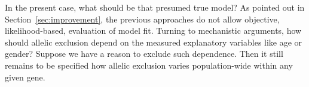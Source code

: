 \documentclass[letterpaper]{article}
\begin{document}
In the present case, what should be that presumed true model?  As pointed out
in Section~\ref{sec:improvement}, the previous approaches do not allow
objective, likelihood-based, evaluation of model fit.  Turning to mechanistic
arguments, how should allelic exclusion depend on the measured explanatory
variables like age or gender?  Suppose we have a reason to exclude such
dependence.  Then it still remains to be specified how allelic exclusion
varies population-wide within any given gene.
\end{document}
